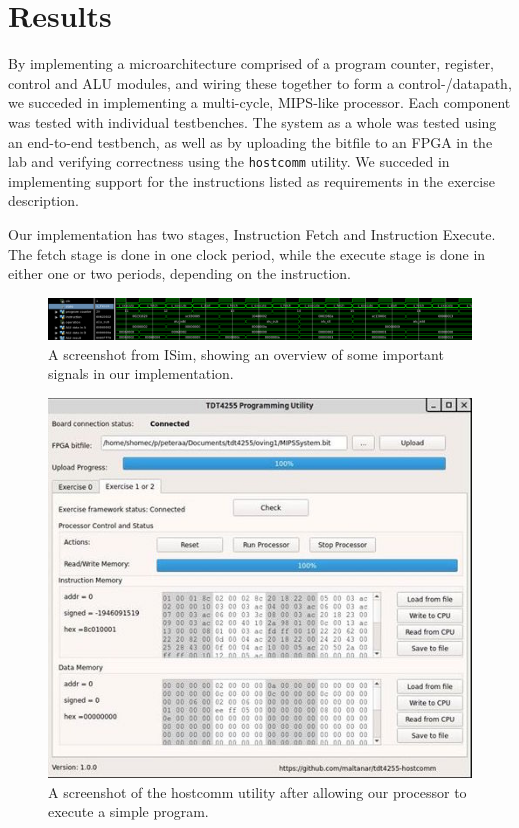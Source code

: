 \chapter{Results}

By implementing a microarchitecture comprised of a program counter, register, control and ALU modules, and wiring these together to form a control-/datapath, we succeded in implementing a multi-cycle, MIPS-like processor.
Each component was tested with individual testbenches.
The system as a whole was tested using an end-to-end testbench, as well as by uploading the bitfile to an FPGA in the lab and verifying correctness using the \texttt{hostcomm} utility.
We succeded in implementing support for the instructions listed as requirements in the exercise description.

Our implementation has two stages, Instruction Fetch and Instruction Execute.
The fetch stage is done in one clock period, while the execute stage is done in either one or two periods, depending on the instruction.

\begin{figure}[h!]
    \includegraphics[width=\linewidth]{img/overview_sim.png}
    \caption{A screenshot from ISim, showing an overview of some important signals in our implementation.}
    \label{fig:waves}
\end{figure}

\begin{figure}[h!]
    \includegraphics[width=\linewidth]{img/hostcomm.jpg}
    \caption{A screenshot of the hostcomm utility after allowing our processor to execute a simple program.}
    \label{fig:hostcomm}
\end{figure}

